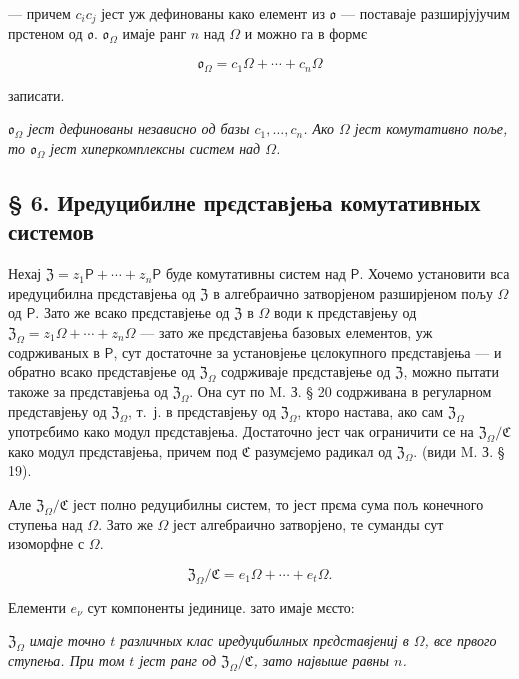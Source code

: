 \documentclass[11pt]{article}
\begin{document}
--- причем \(c_ic_j\) јест уж дефинованы како елемент из \(\mathfrak{o}\) --- поставаје разширјујучим прстеном од \(\mathfrak{o}\). \(\mathfrak{o}_{\Omega}\) имаје ранг \(n\) над \(\Omega\) и можно га в формє

\[
\mathfrak{o}_{\Omega}=c_1\Omega+\cdots+c_n\Omega
\]

записати.

\emph{\(\mathfrak{o}_{\Omega}\) јест дефинованы независно од базы \(c_1,\ldots,c_n\). Ако \(\Omega\) јест комутативно поље, то \(\mathfrak{o}_{\Omega}\) јест хиперкомплексны систем над \(\Omega\).}

\subsection*{§ 6. Иредуцибилне прєдставјења комутативных системов}\label{die-irreduziblen-darstellungen-kommutativer-systeme}

Нехај \(\mathfrak Z=z_1\mathsf P+\cdots+z_n\mathsf P\) буде комутативны систем над \(\mathsf P\). Хочемо установити вса иредуцибилна прєдставјења од \(\mathfrak Z\) в алгебраично затворјеном разширјеном пољу \(\Omega\) од \(\mathsf P\). Зато же всако прєдставјење од \(\mathfrak Z\) в \(\Omega\) води к прєдставјењу од \(\mathfrak Z_\Omega=z_1\Omega+\cdots+z_n\Omega\) --- зато же прєдставјења базовых елементов, уж содрживаных в \(\mathsf P\), сут достаточне за установјење цєлокупного прєдставјења --- и обратно всако прєдставјење од \(\mathfrak Z_\Omega\) содрживаје прєдставјење од \(\mathfrak Z\), можно пытати такоже за прєдставјења од \(\mathfrak Z_\Omega\). Она сут по M. З. § 20 содрживана в регуларном прєдставјењу од \(\mathfrak Z_\Omega\), т.~ј. в прєдставјењу од \(\mathfrak Z_\Omega\), кторо настава, ако сам \(\mathfrak Z_\Omega\) употрєбимо како модул прєдставјења. Достаточно јест чак ограничити се на \(\mathfrak Z_\Omega/\mathfrak C\) како модул прєдставјења, причем под \(\mathfrak C\) разумєјемо радикал од \(\mathfrak Z_\Omega\). (види M. З. § 19).

Але \(\mathfrak Z_\Omega/\mathfrak C\) јест полно редуцибилны систем, то јест прєма сума пољ конечного ступења над \(\Omega\). Зато же \(\Omega\) јест алгебраично затворјено, те суманды сут изоморфне с \(\Omega\).

\[
\mathfrak Z_\Omega/\mathfrak C=e_1\Omega+\cdots+e_t\Omega.
\]

Елементи \(e_\nu\) сут компоненты јединице. зато имаје мєсто:

\emph{\(\mathfrak Z_\Omega\) имаје точно \(t\) различных клас иредуцибилных прєдставјениј в \(\Omega\), все првого ступења. При том \(t\) јест ранг од \(\mathfrak Z_\Omega/\mathfrak C\), зато највыше равны \(n\).}
\end{document}
